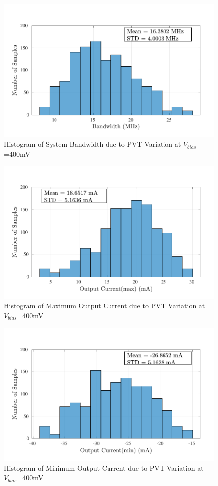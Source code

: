 \begin{figure} [H]
\centering
\includegraphics[scale=1]{Figures/Corners/Overall/PVT_Mid/PDFs/PVT_Mid_bw.pdf}
\caption{Histogram of System Bandwidth due to PVT Variation at $V_{bias}$=400mV}
\end{figure}

\begin{figure} [H]
\centering
\includegraphics[scale=1]{Figures/Corners/Overall/PVT_Mid/PDFs/PVT_Mid_imax.pdf}
\caption{Histogram of Maximum Output Current due to PVT Variation at $V_{bias}$=400mV}
\end{figure}

\begin{figure} [H]
\centering
\includegraphics[scale=1]{Figures/Corners/Overall/PVT_Mid/PDFs/PVT_Mid_imin.pdf}
\caption{Histogram of Minimum Output Current due to PVT Variation at $V_{bias}$=400mV}
\end{figure}

